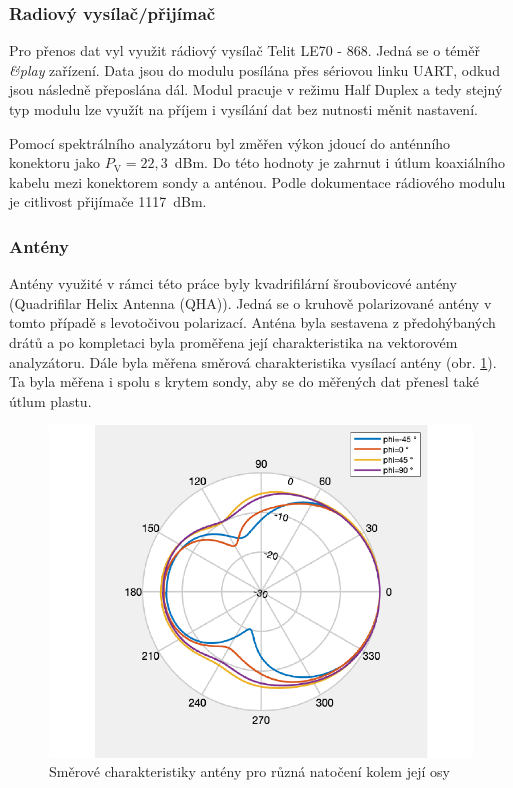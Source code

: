 \documentclass[twoside]{ctuthesis}
\newcommand{\mt}[1]{\text{#1}}
\theoremstyle{plain}
\theoremstyle{definition}
\theoremstyle{note}
\begin{document}
			\subsubsection{Radiový vysílač/přijímač}
			\label{sec:telit}
			Pro přenos dat vyl využit rádiový vysílač Telit LE70 - 868. Jedná se o téměř \textit{\&play} zařízení. Data jsou do modulu posílána přes sériovou linku UART, odkud jsou následně přeposlána dál. Modul pracuje v režimu Half Duplex a tedy stejný typ modulu lze využít na příjem i vysílání dat bez nutnosti měnit nastavení. 

			Pomocí spektrálního analyzátoru byl změřen výkon jdoucí do anténního konektoru jako $P_\mt{V} = 22{,}3$~dBm. Do této hodnoty je zahrnut i útlum koaxiálního kabelu mezi konektorem sondy a anténou. Podle dokumentace rádiového modulu \cite{telit} je citlivost přijímače 1117~dBm.

			\subsubsection{Antény}
			\label{sec:anteny}
			Antény využité v rámci této práce byly kvadrifilární šroubovicové antény (Quadrifilar Helix Antenna (QHA)). Jedná se o kruhově polarizované antény v tomto případě s levotočivou polarizací. Anténa byla sestavena z předohýbaných drátů a po kompletaci byla proměřena její charakteristika na vektorovém analyzátoru. Dále byla měřena směrová charakteristika vysílací antény (obr. \ref{graph:radiation:char}). Ta byla měřena i spolu s krytem sondy, aby se do měřených dat přenesl také útlum plastu. 

			\begin{figure}[hbtp]
				\centering
				\includegraphics[width=.5\textwidth]{Graphs/radiation_plot.pdf}
				\caption{Směrové charakteristiky antény pro různá natočení kolem její osy}
				\label{graph:radiation:char}
			\end{figure}
\end{document}
